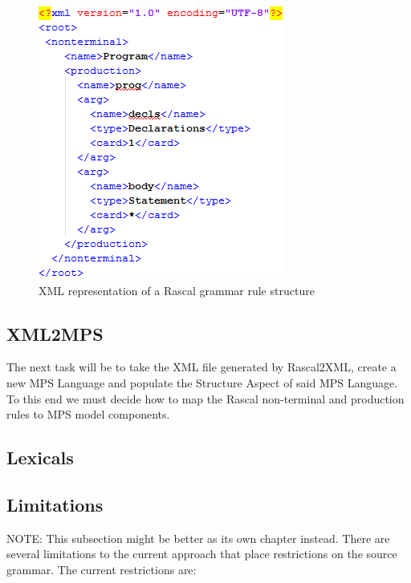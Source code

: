 \documentclass[a4paper]{article}
\begin{document}

\begin{figure}[h]
	\centering
	\includegraphics[scale=0.7]{images/StartSyntaxXML.png}
	\caption{XML representation of a Rascal grammar rule structure}
	\label{fig:XML}
\end{figure}


\subsection{XML2MPS}
The next task will be to take the XML file generated by Rascal2XML, create a new MPS Language and populate the Structure Aspect  of said MPS Language. To this end we must decide how to map the Rascal non-terminal and production rules to MPS model components. 
\subsection{Lexicals}
\subsection{Limitations}
NOTE: This subsection might be better as its own chapter instead.
There are several limitations to the current approach that place restrictions on the source grammar. 
The current restrictions are:
\end{document}
